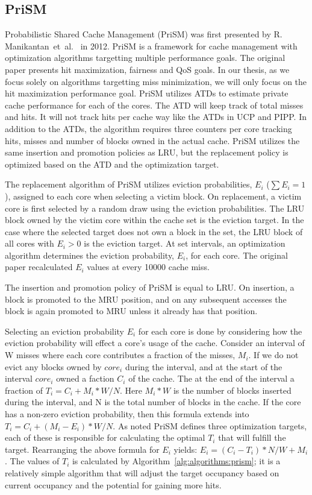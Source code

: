 \subsection{PriSM}
\label{sec:algorithms:prism}

Probabilistic Shared Cache Management (PriSM) was first presented by R. Manikantan~et~al.~\cite{Manikantan2012} in 2012.
PriSM is a framework for cache management with optimization algorithms targetting multiple performance goals.
The original paper presents hit maximization, fairness and QoS goals.
In our thesis, as we focus solely on algorithms targetting miss minimization, we will only focus on the hit maximization performance goal.
PriSM utilizes ATDs to estimate private cache performance for each of the cores.
The ATD will keep track of total misses and hits.
It will not track hits per cache way like the ATDs in UCP and PIPP.
In addition to the ATDs, the algorithm requires three counters per core tracking hits, misses and number of blocks owned in the actual cache.
PriSM utilizes the same insertion and promotion policies as LRU, but the replacement policy is optimized based on the ATD and the optimization target.

The replacement algorithm of PriSM utilizes eviction probabilities, $E_i$ ($\sum{E_i} = 1$), assigned to each core when selecting a victim block.
On replacement, a victim core is first selected by a random draw using the eviction probabilities.
The LRU block owned by the victim core within the cache set is the eviction target.
In the case where the selected target does not own a block in the set, the LRU block of all cores with $E_i > 0$ is the eviction target.
At set intervals, an optimization algorithm determines the eviction probability, $E_i$, for each core.
The original paper recalculated $E_i$ values at every 10000 cache miss.

The insertion and promotion policy of PriSM is equal to LRU.
On insertion, a block is promoted to the MRU position, and on any subsequent accesses the block is again promoted to MRU unless it already has that position.

Selecting an eviction probability $E_i$ for each core is done by considering how the eviction probability will effect a core's usage of the cache.
Consider an interval of W misses where each core contributes a fraction of the misses, $M_i$.
If we do not evict any blocks owned by $core_i$ during the interval, and at the start of the interval $core_i$ owned a faction $C_i$ of the cache.
The at the end of the interval a fraction of $T_i = C_i + M_i * W/N$. 
Here $M_i * W$ is the number of blocks inserted during the interval, and N is the total number of blocks in the cache.
If the core has a non-zero eviction probability, then this formula extends into $T_i = C_i + (M_i - E_i) * W/N$.
As noted PriSM defines three optimization targets, each of these is responsible for calculating the optimal $T_i$ that will fulfill the target.
Rearranging the above formula for $E_i$ yields: $E_i = (C_i - T_i) * N/W + M_i$.
The values of $T_i$ is calculated by Algorithm~\ref{alg:algorithms:prism}; it is a relatively simple algorithm that will adjust the target occupancy based on current occupancy and the potential for gaining more hits.

